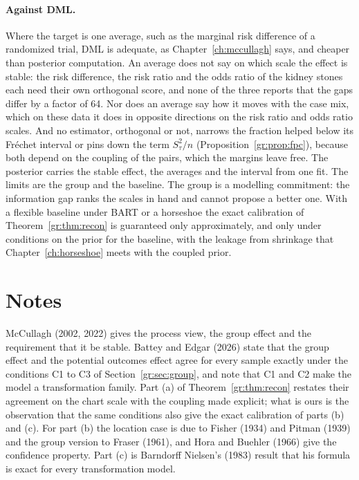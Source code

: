 \paragraph{Against DML.} Where the target is one average, such as the marginal risk difference of a randomized trial, DML is adequate, as Chapter~\ref{ch:mccullagh} says, and cheaper than posterior computation. An average does not say on which scale the effect is stable: the risk difference, the risk ratio and the odds ratio of the kidney stones each need their own orthogonal score, and none of the three reports that the gaps differ by a factor of 64. Nor does an average say how it moves with the case mix, which on these data it does in opposite directions on the risk ratio and odds ratio scales. And no estimator, orthogonal or not, narrows the fraction helped below its Fr\'echet interval or pins down the term $S_\tau^2/n$ (Proposition~\ref{gr:prop:fpc}), because both depend on the coupling of the pairs, which the margins leave free. The posterior carries the stable effect, the averages and the interval from one fit. The limits are the group and the baseline. The group is a modelling commitment: the information gap ranks the scales in hand and cannot propose a better one. With a flexible baseline under BART or a horseshoe the exact calibration of Theorem~\ref{gr:thm:recon} is guaranteed only approximately, and only under conditions on the prior for the baseline, with the leakage from shrinkage that Chapter~\ref{ch:horseshoe} meets with the coupled prior.

\section*{Notes}

McCullagh (2002, 2022) gives the process view, the group effect and the requirement that it be stable. Battey and Edgar (2026) state that the group effect and the potential outcomes effect agree for every sample exactly under the conditions C1 to C3 of Section~\ref{gr:sec:group}, and note that C1 and C2 make the model a transformation family. Part (a) of Theorem~\ref{gr:thm:recon} restates their agreement on the chart scale with the coupling made explicit; what is ours is the observation that the same conditions also give the exact calibration of parts (b) and (c). For part (b) the location case is due to Fisher (1934) and Pitman (1939) and the group version to Fraser (1961), and Hora and Buehler (1966) give the confidence property. Part (c) is Barndorff Nielsen's (1983) result that his formula is exact for every transformation model.

